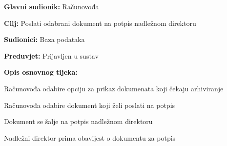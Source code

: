 					
					\noindent {}
					\begin{packed_item}
						
						\item \textbf{Glavni sudionik: } Računovođa
						\item \textbf{Cilj:} Poslati odabrani dokument na potpis nadležnom direktoru
						\item \textbf{Sudionici:} Baza podataka
						\item \textbf{Preduvjet:} Prijavljen u sustav
						\item \textbf{Opis osnovnog tijeka:}
						
						\item[] \begin{packed_enum}
							
							\item Računovođa odabire opciju za prikaz dokumenata koji čekaju arhiviranje
							\item Računovođa odabire dokument koji želi poslati na potpis
							\item Dokument se šalje na potpis nadležnom direktoru
							\item Nadležni direktor prima obavijest o dokumentu za potpis
							
						\end{packed_enum}
					\end{packed_item}
					
